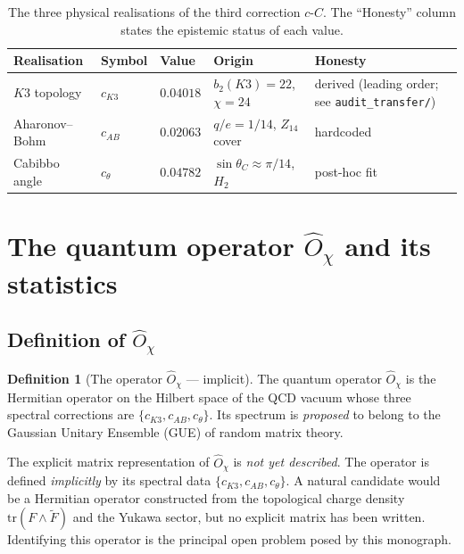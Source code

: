 \documentclass[11pt,a4paper]{article}
\newcommand{\cC}{c\text{-}C}
\newcommand{\Opchi}{\hat{O}_\chi}
\providecommand{\tr}{}
\renewcommand{\tr}{\mathrm{tr}}
\theoremstyle{plain}
\theoremstyle{definition}
\newtheorem{definition}[theorem]{Definition}
\theoremstyle{remark}
\begin{document}
\begin{table}[h]
\centering
\small
\begin{tabular}{l l l l l}
\toprule
Realisation & Symbol & Value & Origin & Honesty \\
\midrule
$K3$ topology       & $c_{K3}$  & $0.04018$ & $b_2(K3) = 22$, $\chi = 24$ & derived (leading order; see \texttt{audit\_transfer/}) \\
Aharonov--Bohm      & $c_{AB}$  & $0.02063$ & $q/e = 1/14$, $Z_{14}$ cover & hardcoded \\
Cabibbo angle       & $c_\theta$ & $0.04782$ & $\sin\theta_C \approx \pi/14$, $H_2$ & post-hoc fit \\
\bottomrule
\end{tabular}
\caption{The three physical realisations of the third correction
$\cC$.  The ``Honesty'' column states the epistemic status of each
value.}
\label{tab:three-real}
\end{table}

\section{The quantum operator $\hat{O}_\chi$ and its statistics}
\label{sec:operator}

\subsection{Definition of $\Opchi$}

\begin{definition}[The operator $\Opchi$ --- implicit]\label{def:Opchi}
The quantum operator $\Opchi$ is the Hermitian operator on the
Hilbert space of the QCD vacuum whose three spectral corrections are
$\{c_{K3}, c_{AB}, c_\theta\}$.  Its spectrum is \emph{proposed} to
belong to the Gaussian Unitary Ensemble (GUE) of random matrix
theory.
\end{definition}

\begin{caveat}
The explicit matrix representation of $\Opchi$ is \emph{not yet
described}.  The operator is defined \emph{implicitly} by its spectral
data $\{c_{K3}, c_{AB}, c_\theta\}$.  A natural candidate would be a
Hermitian operator constructed from the topological charge density
$\tr(F\wedge\tilde F)$ and the Yukawa sector, but no explicit matrix
has been written.  Identifying this operator is the principal open
problem posed by this monograph.
\end{caveat}
\end{document}
